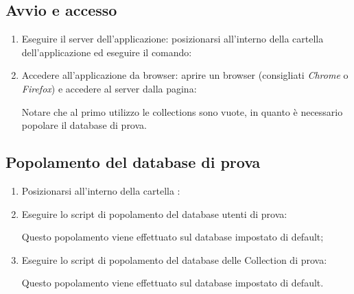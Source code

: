 \subsection{Avvio e accesso}

\begin{enumerate}
 	\item Eseguire il server dell'applicazione: posizionarsi all'interno della cartella dell'applicazione ed eseguire il comando:
 
 	\centerline{  }
 	
 	\item Accedere all'applicazione da browser: aprire un browser (consigliati \textit{Chrome} o \textit{Firefox}) e accedere al server dalla pagina:
 	
 	\centerline{  }
 	
 	Notare che al primo utilizzo le collections sono vuote, in quanto è necessario popolare il database di prova.
 
\end{enumerate}	

\subsection{Popolamento del database di prova}

\begin{enumerate}

	\item Posizionarsi all'interno della cartella :
	
	\centerline{  }
	
	\item Eseguire lo script di popolamento del database utenti di prova:

	\centerline{}
	
	Questo popolamento viene effettuato sul database impostato di default;
	
	\item Eseguire lo script di popolamento del database delle Collection di prova:

	\centerline{}
	
	Questo popolamento viene effettuato sul database impostato di default.

\end{enumerate}	